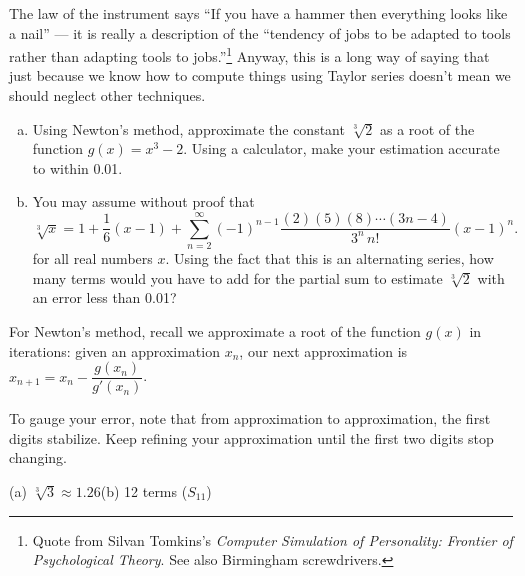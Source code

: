 \begin{Mquestion}
The law of the instrument says ``If you have a hammer then everything looks like a nail'' --- it is really a
description of the ``tendency of jobs to be adapted to tools rather than adapting tools to jobs.''\footnote{Quote
from Silvan Tomkins's \emph{Computer Simulation of Personality: Frontier of Psychological Theory}. See also
Birmingham screwdrivers.} Anyway, this is a long way of saying that just because we know how to compute things
using Taylor series doesn't mean we should neglect other techniques.
	\begin{enumerate}[(a)]
		\item Using Newton's method, approximate the constant $\sqrt[3]{2}$ as a root of the function $g(x)=x^3-2$. Using a calculator, make your estimation accurate to within 0.01.
		\item You may assume without proof that
		\[\sqrt[3]{x}=1+\frac{1}{6}(x-1)+\sum_{n=2}^\infty(-1)^{n-1}\frac{(2)(5)(8)\cdots(3n-4)}{3^n\, n!}(x-1)^n.\]
		for all real numbers $x$. Using the fact that this is an alternating series, how many terms would you have to add for the partial sum to estimate $\sqrt[3]{2}$ with an error less than 0.01?
	\end{enumerate}


\end{Mquestion}
\begin{hint}
For Newton's method, recall we approximate a root of the function $g(x)$ in iterations: given an approximation $x_n$, our next approximation is $x_{n+1}=x_n-\dfrac{g(x_n)}{g'(x_n)}$.

To gauge your error, note that from approximation to approximation, the first digits stabilize. Keep refining your approximation until the first two digits stop changing.
\end{hint}
\begin{answer}
(a) $\sqrt[3]{3}\approx 1.26$\qquad (b) 12 terms ($S_{11}$)
\end{answer}
